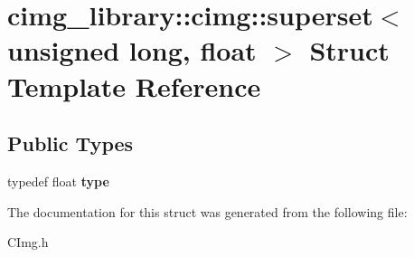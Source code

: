 \hypertarget{structcimg__library_1_1cimg_1_1superset_3_01unsigned_01long_00_01float_01_4}{\section{cimg\-\_\-library\-:\-:cimg\-:\-:superset$<$ unsigned long, float $>$ Struct Template Reference}
\label{structcimg__library_1_1cimg_1_1superset_3_01unsigned_01long_00_01float_01_4}
}
\subsection*{Public Types}
\begin{DoxyCompactItemize}
\item 
\hypertarget{structcimg__library_1_1cimg_1_1superset_3_01unsigned_01long_00_01float_01_4_a93abb2d055b18c9528e27ded8cd15423}{typedef float {\bfseries type}}\label{structcimg__library_1_1cimg_1_1superset_3_01unsigned_01long_00_01float_01_4_a93abb2d055b18c9528e27ded8cd15423}

\end{DoxyCompactItemize}


The documentation for this struct was generated from the following file\-:\begin{DoxyCompactItemize}
\item 
C\-Img.\-h\end{DoxyCompactItemize}
